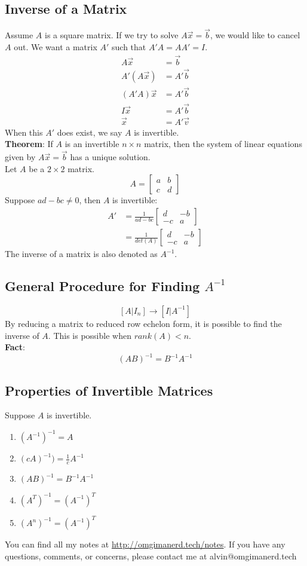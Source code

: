 \documentclass[letterpaper, 12pt]{math}
\begin{document}
\subsection*{Inverse of a Matrix}
Assume \( A \) is a square matrix. If we try to solve \( A\vec{x} = \vec{b} \),
we would like to cancel \( A \) out. We want a matrix \( A' \) such that
\( A'A = AA' = I \).
\begin{align*}
  A\vec{x} &= \vec{b} \\
  A'(A\vec{x}) &= A'\vec{b} \\
  (A'A)\vec{x} &= A'\vec{b} \\
  I\vec{x} &= A'\vec{b} \\
  \vec{x} &= A'\vec{v}
\end{align*}
When this \( A' \) does exist, we say \( A \) is invertible. \\
\textbf{Theorem}: If \( A \) is an invertible \( n\times n \) matrix, then the
system of linear equations given by \( A\vec{x} = \vec{b} \) has a unique
solution. \\
Let \( A \) be a \( 2\times2 \) matrix.
\[ A = \begin{bmatrix}a & b \\ c & d\end{bmatrix} \]
Suppose \( ad-bc \ne 0 \), then \( A \) is invertible:
\begin{align*}
  A' &= \frac{1}{ad-bc}\begin{bmatrix}d & -b \\ -c & a\end{bmatrix} \\
  &= \frac{1}{det(A)}\begin{bmatrix}d & -b \\ -c & a\end{bmatrix}
\end{align*}
The inverse of a matrix is also denoted as \( A^{-1} \).

\subsection*{General Procedure for Finding \( A^{-1} \)}
\[ [A|I_n] \rightarrow [I|A^{-1}] \]
By reducing a matrix to reduced row echelon form, it is possible to find the
inverse of \( A \). This is possible when \( rank(A) < n \). \\
\textbf{Fact}:
\[ (AB)^{-1} = B^{-1}A^{-1} \]

\subsection*{Properties of Invertible Matrices}
Suppose \( A \) is invertible.
\begin{enumerate}
  \item \( (A^{-1})^{-1} = A \)
  \item \( (cA)^{-1}) = \frac{1}{c}A^{-1} \)
  \item \( (AB)^{-1} = B^{-1}A^{-1} \)
  \item \( (A^T)^{-1} = (A^{-1})^T \)
  \item \( (A^n)^{-1} = (A^{-1})^T \)
\end{enumerate}

\begin{center}
  You can find all my notes at \url{http://omgimanerd.tech/notes}. If you have
  any questions, comments, or concerns, please contact me at
  alvin@omgimanerd.tech
\end{center}
\end{document}
